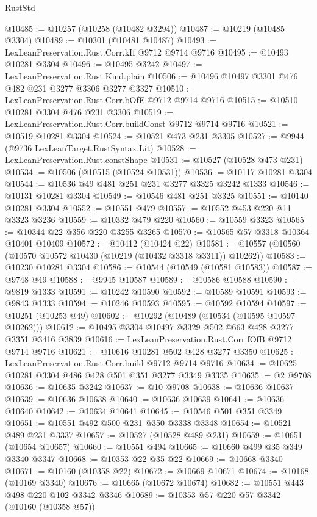 \begin{lexlean}{RustStd}
\begin{coremodule}
@10485 := @10257 (@10258 (@10482 @3294))
@10487 := @10219 (@10485 @3304)
@10489 := @10301 (@10481 @10487)
@10493 := LexLeanPreservation.Rust.Corr.kIf @9712 @9714 @9716
@10495 := @10493 @10281 @3304
@10496 := @10495 @3242
@10497 := LexLeanPreservation.Rust.Kind.plain
@10506 := @10496 @10497 @3301 @476 @482 @231 @3277 @3306 @3277 @3327
@10510 := LexLeanPreservation.Rust.Corr.bOfE @9712 @9714 @9716
@10515 := @10510 @10281 @3304 @476 @231 @3306
@10519 := LexLeanPreservation.Rust.Corr.buildConst @9712 @9714 @9716
@10521 := @10519 @10281 @3304
@10524 := @10521 @473 @231 @3305
@10527 := @9944 (@9736 LexLeanTarget.RustSyntax.Lit)
@10528 := LexLeanPreservation.Rust.constShape
@10531 := @10527 (@10528 @473 @231)
@10534 := @10506 (@10515 (@10524 @10531))
@10536 := @10117 @10281 @3304
@10544 := @10536 @49 @481 @251 @231 @3277 @3325 @3242 @1333
@10546 := @10131 @10281 @3304
@10549 := @10546 @481 @251 @3325
@10551 := @10140 @10281 @3304
@10552 := @10551 @479
@10557 := @10552 @453 @220 @11 @3323 @3236
@10559 := @10332 @479 @220
@10560 := @10559 @3323
@10565 := @10344 @22 @356 @220 @3255 @3265
@10570 := @10565 @57 @3318 @10364 @10401 @10409
@10572 := @10412 (@10424 @22)
@10581 := @10557 (@10560 (@10570 @10572 @10430 (@10219 (@10432 @3318 @3311)) @10262))
@10583 := @10230 @10281 @3304
@10586 := @10544 (@10549 (@10581 @10583))
@10587 := @9748 @49
@10588 := @9945 @10587
@10589 := @10586 @10588
@10590 := @9819 @1333
@10591 := @10242 @10590
@10592 := @10589 @10591
@10593 := @9843 @1333
@10594 := @10246 @10593
@10595 := @10592 @10594
@10597 := @10251 (@10253 @49)
@10602 := @10292 (@10489 (@10534 (@10595 @10597 @10262)))
@10612 := @10495 @3304 @10497 @3329 @502 @663 @428 @3277 @3351 @3416 @3839
@10616 := LexLeanPreservation.Rust.Corr.fOfB @9712 @9714 @9716
@10621 := @10616 @10281 @502 @428 @3277 @3350
@10625 := LexLeanPreservation.Rust.Corr.build @9712 @9714 @9716
@10634 := @10625 @10281 @3304 @486 @428 @501 @351 @3277 @3349 @3335
@10635 := @2 @9708
@10636 := @10635 @3242
@10637 := @10 @9708
@10638 := @10636 @10637
@10639 := @10636 @10638
@10640 := @10636 @10639
@10641 := @10636 @10640
@10642 := @10634 @10641
@10645 := @10546 @501 @351 @3349
@10651 := @10551 @492 @500 @231 @350 @3338 @3348
@10654 := @10521 @489 @231 @3337
@10657 := @10527 (@10528 @489 @231)
@10659 := @10651 (@10654 @10657)
@10660 := @10551 @494
@10665 := @10660 @499 @35 @349 @3340 @3347
@10668 := @10353 @22 @35 @22
@10669 := @10668 @3340
@10671 := @10160 (@10358 @22)
@10672 := @10669 @10671
@10674 := @10168 (@10169 @3340)
@10676 := @10665 (@10672 @10674)
@10682 := @10551 @443 @498 @220 @102 @3342 @3346
@10689 := @10353 @57 @220 @57 @3342 (@10160 (@10358 @57))

\end{coremodule}
\end{lexlean}
